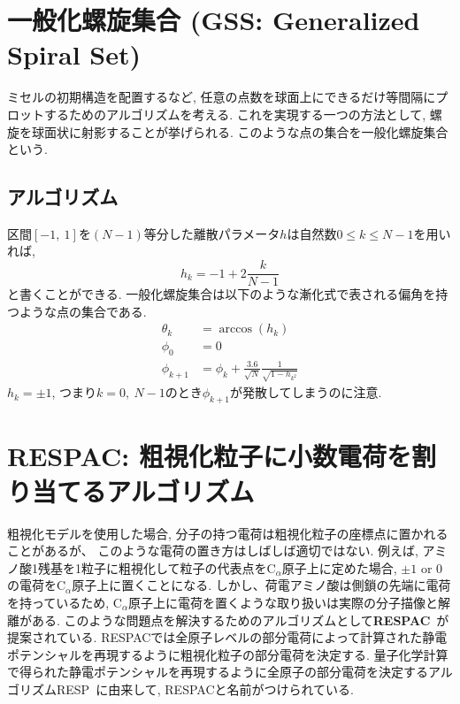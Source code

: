 \section{一般化螺旋集合 (GSS: Generalized Spiral Set)}
ミセルの初期構造を配置するなど, 任意の点数を球面上にできるだけ等間隔にプロットするためのアルゴリズムを考える. 
これを実現する一つの方法として, 螺旋を球面状に射影することが挙げられる. 
このような点の集合を一般化螺旋集合という. 

\subsection{アルゴリズム}
区間$[-1,~1]$を$(N-1)$等分した離散パラメータ$h$は自然数$0\le k \le N-1$を用いれば, 
\begin{equation}
    h_{k} = -1 + 2 \frac{k}{N-1}
\end{equation}
と書くことができる. 
一般化螺旋集合は以下のような漸化式で表される偏角を持つような点の集合である. 
\begin{align}
    \theta_{k} &= \arccos(h_{k}) \\
    \phi_{0} &= 0 \\
    \phi_{k+1} &= \phi_{k} + \frac{3.6}{\sqrt{N}} \frac{1}{\sqrt{1-h_{k^{2}}}}
\end{align}
$h_{k} = \pm 1$, つまり$k=0,~N-1$のとき$\phi_{k+1}$が発散してしまうのに注意. 

\clearpage

\section{RESPAC: 粗視化粒子に小数電荷を割り当てるアルゴリズム}
粗視化モデルを使用した場合, 分子の持つ電荷は粗視化粒子の座標点に置かれることがあるが、
このような電荷の置き方はしばしば適切ではない.
例えば, アミノ酸1残基を1粒子に粗視化して粒子の代表点をC$_\alpha$原子上に定めた場合, $\pm 1$ or $0$の電荷をC$_\alpha$原子上に置くことになる. しかし、荷電アミノ酸は側鎖の先端に電荷を持っているため, C$_\alpha$原子上に電荷を置くような取り扱いは実際の分子描像と解離がある.
このような問題点を解決するためのアルゴリズムとして\textbf{RESPAC}~\cite{Terakawa2014}が提案されている.
RESPACでは全原子レベルの部分電荷によって計算された静電ポテンシャルを再現するように粗視化粒子の部分電荷を決定する.
量子化学計算で得られた静電ポテンシャルを再現するように全原子の部分電荷を決定するアルゴリズムRESP~\cite{Bayly1993, Besler1990}に由来して, RESPACと名前がつけられている.

